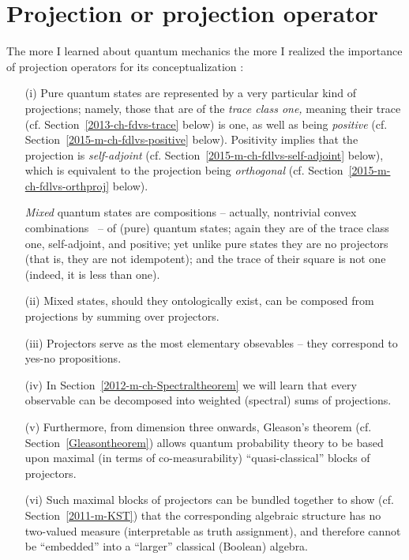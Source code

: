 \section{Projection or projection operator}
\label{2011-m-projec}

The more I learned about quantum mechanics the more
I realized the importance of projection operators for its conceptualization \cite{v-neumann-49,v-neumann-55,birkhoff-36}:
\begin{itemize}
\item[(i)]
Pure quantum states
are represented by a very particular kind of projections;
namely, those that are of the {\em trace class one,} meaning their trace (cf. Section~\ref{2013-ch-fdvs-trace} below) is one,
as well as being {\em positive}
(cf. Section~\ref{2015-m-ch-fdlvs-positive} below).
Positivity implies
that the projection is {\em self-adjoint} (cf. Section~\ref{2015-m-ch-fdlvs-self-adjoint} below),
which is equivalent to the projection being {\em orthogonal}  (cf. Section~\ref{2015-m-ch-fdlvs-orthproj} below).

{\em Mixed} quantum states
are compositions -- actually, nontrivial convex combinations~ -- of (pure) quantum states; again they are of the trace class one, self-adjoint, and positive;
yet unlike pure states they are no projectors (that is, they are not idempotent);
and the trace of their square is not one (indeed, it is less than one).
\item[(ii)]
Mixed states, should they ontologically exist, can be composed from projections by summing over projectors.
\item[(iii)]
Projectors serve as the most elementary obsevables -- they correspond to yes-no propositions.
\item[(iv)]
In Section~\ref{2012-m-ch-Spectraltheorem} we will learn
that every observable can be decomposed into weighted (spectral) sums of projections.
\item[(v)]
Furthermore, from dimension three onwards, Gleason's theorem (cf. Section~\ref{Gleasontheorem}) allows
quantum probability theory to be based upon maximal (in terms of co-measurability) ``quasi-classical''
blocks of projectors.
\item[(vi)]
Such maximal blocks of projectors can be bundled together to show (cf. Section~\ref{2011-m-KST})
that the corresponding algebraic
structure has no two-valued measure (interpretable as truth assignment), and
therefore cannot be ``embedded'' into a ``larger'' classical (Boolean) algebra.
\end{itemize}



